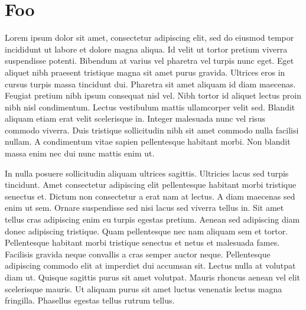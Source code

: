 \documentclass{article}
\begin{document}
\section{Foo}
\label{foo}
Lorem ipsum dolor sit amet, consectetur adipiscing elit, sed do eiusmod tempor
incididunt ut labore et dolore magna aliqua. Id velit ut tortor pretium viverra
suspendisse potenti. Bibendum at varius vel pharetra vel turpis nunc eget. Eget
aliquet nibh praesent tristique magna sit amet purus gravida. Ultrices eros in
cursus turpis massa tincidunt dui. Pharetra sit amet aliquam id diam maecenas.
Feugiat pretium nibh ipsum consequat nisl vel. Nibh tortor id aliquet lectus
proin nibh nisl condimentum. Lectus vestibulum mattis ullamcorper velit sed.
Blandit aliquam etiam erat velit scelerisque in. Integer malesuada nunc vel
risus commodo viverra. Duis tristique sollicitudin nibh sit amet commodo nulla
facilisi nullam. A condimentum vitae sapien pellentesque habitant morbi. Non
blandit massa enim nec dui nunc mattis enim ut.
\par
In nulla posuere sollicitudin aliquam ultrices sagittis. Ultricies lacus sed
turpis tincidunt. Amet consectetur adipiscing elit pellentesque habitant morbi
tristique senectus et. Dictum non consectetur a erat nam at lectus. A diam
maecenas sed enim ut sem. Ornare suspendisse sed nisi lacus sed viverra tellus
in. Sit amet tellus cras adipiscing enim eu turpis egestas pretium. Aenean sed
adipiscing diam donec adipiscing tristique. Quam pellentesque nec nam aliquam
sem et tortor. Pellentesque habitant morbi tristique senectus et netus et
malesuada fames. Facilisis gravida neque convallis a cras semper auctor neque.
Pellentesque adipiscing commodo elit at imperdiet dui accumsan sit. Lectus
nulla at volutpat diam ut. Quisque sagittis purus sit amet volutpat. Mauris
rhoncus aenean vel elit scelerisque mauris. Ut aliquam purus sit amet luctus
venenatis lectus magna fringilla. Phasellus egestas tellus rutrum tellus.
\end{document}
